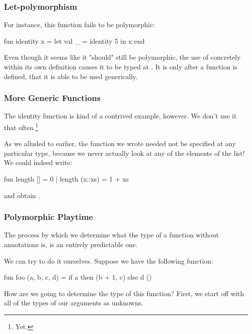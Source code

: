 \documentclass[aspectratio=169]{beamer}
\begin{document}
\begin{frame}[fragile]
  \frametitle{Let-polymorphism}

  For instance, this function fails to be polymorphic:
  \pause
  \begin{codeblock}
    fun identity x =
      let
        val _ = identity 5
      in
        x
      end
  \end{codeblock}

  \pause
  \vspace{\fill}

  Even though it seems like it "should" still be polymorphic, the use of 
  concretely within its own definition causes it to be typed at . It
  is only after a function is defined, that it is able to be used generically.
\end{frame}

\begin{frame}[fragile]
  \frametitle{More Generic Functions}

  The identity function is kind of a contrived example, however. We don't use it that
  often.\footnote{Yet.}

  \pause
  \vspace{\fill}

  As we alluded to earlier, the  function we wrote needed not be specified
  at any particular type, because we never actually look at any of the elements of
  the list! We could indeed write:

  \pause
  \vspace{\fill}

  \begin{codeblock}
    fun length [] = 0
      | length (x::xs) = 1 + xs
  \end{codeblock}

  and obtain .
\end{frame}

\begin{frame}[fragile]
  \frametitle{Polymorphic Playtime}

  The process by which we determine what the type of a function without
  annotations is, is an entirely predictable one.

  \pause
  \vspace{\fill}

  We can try to do it ourselves. Suppose we have the following function:

  \pause
  \begin{codeblock}
    fun foo (a, b, c, d) =
      if a then
        (b + 1, c)
      else
        d ()
  \end{codeblock}

  \pause
  \vspace{\fill}

  How are we going to determine the type of this function? First, we
  start off with all of the types of our arguments as unknowns.
\end{frame}
\end{document}
